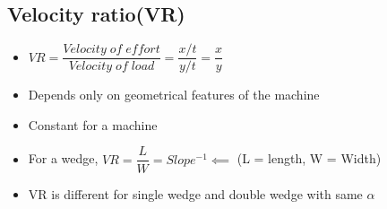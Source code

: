 \documentclass[8pt]{report}
\begin{document}
\subsection{Velocity ratio(VR)}
	\begin{itemize}
		\item $\boxed{VR = \dfrac{Velocity\;of\;effort}{Velocity\;of\;load} = \dfrac{x/t}{y/t} = \dfrac{x}{y}}$
		\item Depends only on geometrical features of the machine
		\item Constant for a machine
		\item For a wedge, $\boxed{VR = \dfrac{L}{W}} = Slope^{-1} \impliedby$ (L = length, W = Width)
		\item VR is different for single wedge and double wedge with same $\alpha$
	\end{itemize}\hrulefill
\end{document}
